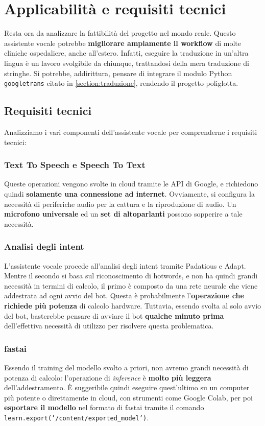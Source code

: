 \chapter{Applicabilità e requisiti tecnici}
\label{chap:applicabilita}
Resta ora da analizzare la fattibilità del progetto nel mondo reale. Questo assistente vocale potrebbe \textbf{migliorare ampiamente il workflow} di molte cliniche ospedaliere, anche all'estero. Infatti, eseguire la traduzione in un'altra lingua è un lavoro svolgibile da chiunque, trattandosi della mera traduzione di stringhe. Si potrebbe, addirittura, pensare di integrare il modulo Python \texttt{googletrans} citato in \ref{section:traduzione}, rendendo il progetto poliglotta.
\section{Requisiti tecnici}
Analizziamo i vari componenti dell'assistente vocale per comprenderne i requisiti tecnici:
\subsection{Text To Speech e Speech To Text}
Queste operazioni vengono svolte in cloud tramite le API di Google, e richiedono quindi \textbf{solamente una connessione ad internet}. Ovviamente, si configura la necessità di periferiche audio per la cattura e la riproduzione di audio. Un \textbf{microfono universale} ed un \textbf{set di altoparlanti} possono sopperire a tale necessità.
\subsection{Analisi degli intent}
L'assistente vocale procede all'analisi degli intent tramite Padatious e Adapt. Mentre il secondo si basa sul riconoscimento di hotwords, e non ha quindi grandi necessità in termini di calcolo, il primo è composto da una rete neurale che viene addestrata ad ogni avvio del bot. Questa è probabilmente l'\textbf{operazione che richiede più potenza} di calcolo hardware. Tuttavia, essendo svolta al solo avvio del bot, basterebbe pensare di avviare il bot \textbf{qualche minuto prima} dell'effettiva necessità di utilizzo per risolvere questa problematica.
\subsection{fastai}
Essendo il training del modello svolto a priori, non avremo grandi necessità di potenza di calcolo: l'operazione di \textit{inference} è \textbf{molto più leggera} dell'addestramento. È suggeribile quindi eseguire quest'ultimo su un computer più potente o direttamente in cloud, con strumenti come Google Colab, per poi \textbf{esportare il modello} nel formato di fastai tramite il comando \texttt{learn.export('/content/exported\_model')}.
